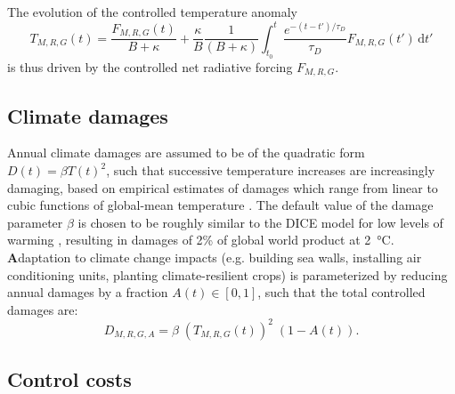 \documentclass{article}
\begin{document}
The evolution of the controlled temperature anomaly
\begin{equation}
    T_{M,R,G}(t) = \frac{F_{M,R,G}(t)}{B + \kappa} + \frac{\kappa}{B} \frac{1}{(B+\kappa)} \int_{t_{0}}^{t} \frac{ e^{-(t-t')/\tau_{D}}}{\tau_{D}} F_{M,R,G}(t') \, \text{d}t'\label{eq.temperature}
\end{equation}
is thus driven by the controlled net radiative forcing $F_{M,R,G}$.

\subsection{Climate damages}

Annual climate damages are assumed to be of the quadratic form $D(t) = \beta T(t)^{2}$, such that successive temperature increases are increasingly damaging, based on empirical estimates of damages which range from linear to cubic functions of global-mean temperature \citep{ster}. The default value of the damage parameter $\beta$ is chosen to be roughly similar to the DICE model for low levels of warming \citep{nordhaus2013dice}, resulting in damages of 2\% of global world product at \SI{2}{\celsius}. \textbf{A}daptation to climate change impacts (e.g. building sea walls, installing air conditioning units, planting climate-resilient crops) is parameterized by reducing annual damages by a fraction $A(t) \in [0,1]$, such that the total controlled damages are:
\begin{equation}
    D_{M, R, G, A} = \beta \; (T_{M, R, G}(t))^{2} \; (1-A(t)).
\end{equation}

\subsection{Control costs}
\end{document}
